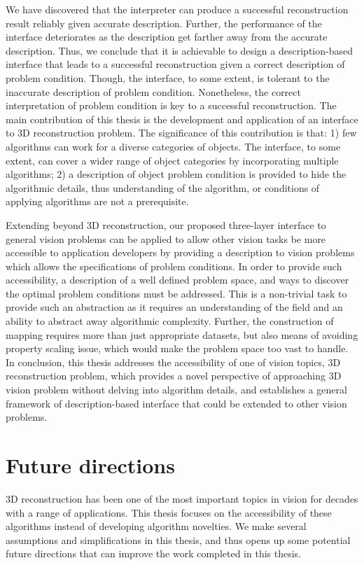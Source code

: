 We have discovered that the interpreter can produce a successful reconstruction result reliably given accurate description. Further, the performance of the interface deteriorates as the description get farther away from the accurate description. Thus, we conclude that it is achievable to design a description-based interface that leads to a successful reconstruction given a correct description of problem condition. Though, the interface, to some extent, is tolerant to the inaccurate description of problem condition. Nonetheless, the correct interpretation of problem condition is key to a successful reconstruction. The main contribution of this thesis is the development and application of an interface to 3D reconstruction problem. The significance of this contribution is that: 1) few algorithms can work for a diverse categories of objects. The interface, to some extent, can cover a wider range of object categories by incorporating multiple algorithms; 2) a description of object problem condition is provided to hide the algorithmic details, thus understanding of the algorithm, or conditions of applying algorithms are not a prerequisite.

Extending beyond 3D reconstruction, our proposed three-layer interface to general vision problems can be applied to allow other vision tasks be more accessible to application developers by providing a description to vision problems which allows the specifications of problem conditions. In order to provide such accessibility, a description of a well defined problem space, and ways to discover the optimal problem conditions must be addressed. This is a non-trivial task to provide such an abstraction as it requires an understanding of the field and an ability to abstract away algorithmic complexity. Further, the construction of mapping requires more than just appropriate datasets, but also means of avoiding property scaling issue, which would make the problem space too vast to handle. In conclusion, this thesis addresses the accessibility of one of vision topics, 3D reconstruction problem, which provides a novel perspective of approaching 3D vision problem without delving into algorithm details, and establishes a general framework of description-based interface that could be extended to other vision problems.

\section{Future directions}
3D reconstruction has been one of the most important topics in vision for decades with a range of applications. This thesis focuses on the accessibility of these algorithms instead of developing algorithm novelties. We make several assumptions and simplifications in this thesis, and thus opens up some potential future directions that can improve the work completed in this thesis.

